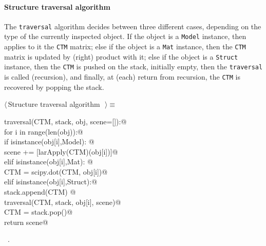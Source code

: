 \documentclass[11pt,oneside]{article}	%
\begin{document}
\paragraph{Structure traversal algorithm}

The \texttt{traversal} algorithm decides between three different cases, depending on the type of the currently inspected object. If the object is a \texttt{Model} instance, then applies to it the \texttt{CTM} matrix; else if the object is a \texttt{Mat} instance, then the \texttt{CTM} matrix is updated by (right) product with it; else if the object is a \texttt{Struct} instance, then the \texttt{CTM} is pushed on the stack, initially empty, then the \texttt{traversal} is called (recursion), and finally, at (each) return from recursion, the \texttt{CTM} is recovered by popping the stack.

\begin{flushleft} \small \label{scrap37}
$\langle\,$Structure traversal algorithm\nobreak\ {\footnotesize {}}$\,\rangle\equiv$
\vspace{-1ex}
\begin{list}{}{} \item
\mbox{}\verb@def traversal(CTM, stack, obj, scene=[]):@\\
\mbox{}\verb@    for i in range(len(obj)):@\\
\mbox{}\verb@        if isinstance(obj[i],Model): @\\
\mbox{}\verb@            scene += [larApply(CTM)(obj[i])]@\\
\mbox{}\verb@        elif isinstance(obj[i],Mat): @\\
\mbox{}\verb@            CTM = scipy.dot(CTM, obj[i])@\\
\mbox{}\verb@        elif isinstance(obj[i],Struct):@\\
\mbox{}\verb@            stack.append(CTM) @\\
\mbox{}\verb@            traversal(CTM, stack, obj[i], scene)@\\
\mbox{}\verb@            CTM = stack.pop()@\\
\mbox{}\verb@    return scene@\\
\mbox{}\verb@@{\NWsep}
\end{list}
\vspace{-1ex}
\footnotesize\addtolength{\baselineskip}{-1ex}
\begin{list}{}{\setlength{\itemsep}{-\parsep}\setlength{\itemindent}{-\leftmargin}}
\item \NWtxtMacroRefIn\ .
\end{list}
\end{flushleft}
\end{document}
